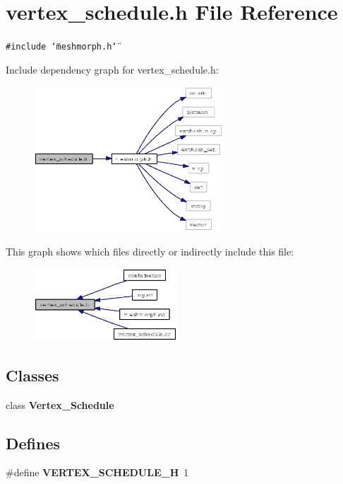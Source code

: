 \section{vertex\_\-schedule.h File Reference}
\label{vertex__schedule_8h}
{\tt \#include \char`\"{}meshmorph.h\char`\"{}}\par


Include dependency graph for vertex\_\-schedule.h:\begin{figure}[H]
\begin{center}
\leavevmode
\includegraphics[width=201pt]{vertex__schedule_8h__incl}
\end{center}
\end{figure}


This graph shows which files directly or indirectly include this file:\begin{figure}[H]
\begin{center}
\leavevmode
\includegraphics[width=152pt]{vertex__schedule_8h__dep__incl}
\end{center}
\end{figure}
\subsection*{Classes}
\begin{CompactItemize}
\item 
class {\bf Vertex\_\-Schedule}
\end{CompactItemize}
\subsection*{Defines}
\begin{CompactItemize}
\item 
\#define {\bf VERTEX\_\-SCHEDULE\_\-H}~1
\end{CompactItemize}


